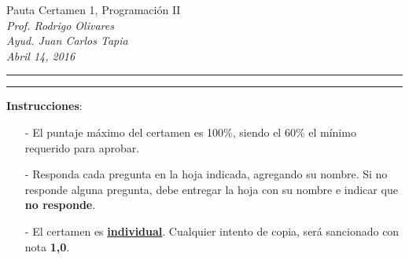 \documentclass[10pt]{article}
\begin{document}
\begin{center}
    {\Large Pauta Certamen 1, Programaci\'on II} \\
    \emph{\small Prof. Rodrigo Olivares} \\
    \emph{\small Ayud. Juan Carlos Tapia} \\
    \emph{\scriptsize Abril 14, 2016}
\end{center}
\vspace*{-35pt}
\begin{center}
    \rule{1\textwidth}{.3pt}
\end{center}
\vspace*{-42pt}
\begin{center}
    \rule{1\textwidth}{2pt}
\end{center}

\vspace*{-15pt}
{\small \textbf{Instrucciones}:}
\vspace*{-15pt}

{\scriptsize
\begin{itemize}
    \item[-] El puntaje m\'aximo del certamen es 100\%, siendo el 60\% el m\'inimo requerido para aprobar.
    \item[-] Responda cada pregunta en la hoja indicada, agregando su nombre. Si no responde alguna pregunta, debe entregar la hoja con su nombre e indicar que \textbf{no responde}.
    \item[-] El certamen es \underline{\textbf{individual}}. Cualquier intento de copia, ser\'a sancionado con nota \textbf{1,0}.
\end{itemize}
}
\vspace*{10pt}

\vspace*{-30pt}
\end{document}
